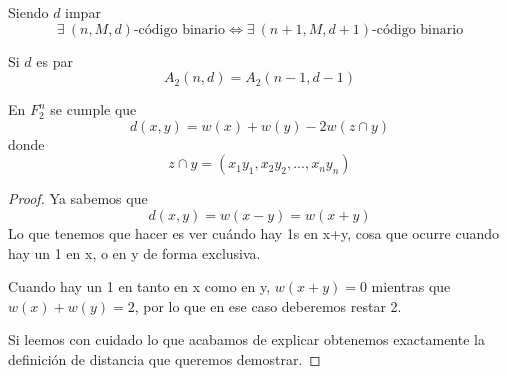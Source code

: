 \begin{prop}\label{prop:existencia_codigos_binarios}
Siendo $d$ impar
\[\exists  \ (n,M,d)\text{-código binario} \iff \exists \ (n+1,M,d+1) \text{-código binario}\]
\end{prop}
\begin{corol}
Si $d$ es par
\[A_2(n,d)=A_2(n-1,d-1)\]
\end{corol}

\begin{lemma}
En $F_2^n$ se cumple que
\[d(x,y) = w(x)+w(y)-2w(z\cap y)\]
donde
\[z \cap y = (x_1y_1,x_2y_2,...,x_ny_n)\]
\end{lemma}
\begin{proof}
Ya sabemos que
\[d(x,y) = w(x-y)=w(x+y)\]
Lo que tenemos que hacer es ver cuándo hay 1s en x+y, cosa que ocurre cuando hay un 1 en x, o en y de forma exclusiva.

Cuando hay un 1 en tanto en x como en y, $w(x+y)=0$ mientras que $w(x)+w(y)=2$, por lo que en ese caso deberemos restar 2.

Si leemos con cuidado lo que acabamos de explicar obtenemos exactamente la definición de distancia que queremos demostrar.
\end{proof}

